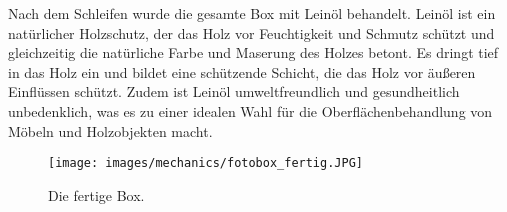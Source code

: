 Nach dem Schleifen wurde die gesamte Box mit Leinöl behandelt.
Leinöl ist ein natürlicher Holzschutz, der das Holz vor Feuchtigkeit
und Schmutz schützt und gleichzeitig die natürliche Farbe und Maserung des Holzes
betont. Es dringt tief in das Holz ein und bildet eine schützende Schicht,
die das Holz vor äußeren Einflüssen schützt. Zudem ist Leinöl umweltfreundlich
und gesundheitlich unbedenklich, was es zu einer idealen Wahl für die
Oberflächenbehandlung von Möbeln und Holzobjekten macht.


\begin{figure}[H]
    \centering
    \texttt{[image: images/mechanics/fotobox\_fertig.JPG]}
    \caption{Die fertige Box.}
    \label{fig:gewinde_schneiden}
\end{figure}